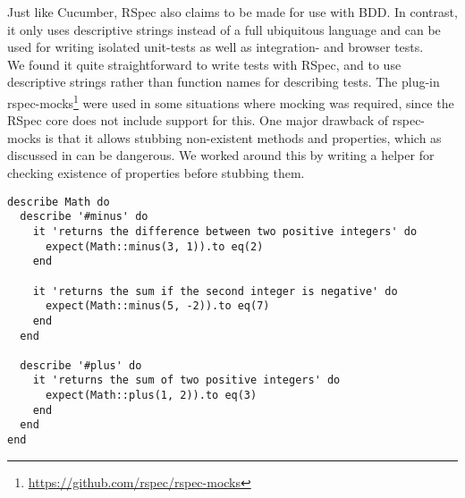 
Just like Cucumber, RSpec also claims to be made for use with
BDD\cite{web:rspec}. In contrast, it only uses descriptive strings
instead of a full ubiquitous language and can be used for writing
isolated unit-tests as well as integration- and browser tests.\\

We found it quite straightforward to write tests with RSpec, and to use
descriptive strings rather than function names for describing tests. The
plug-in rspec-mocks\footnote{\url{https://github.com/rspec/rspec-mocks}}
were used in some situations where mocking was required, since the RSpec
core does not include support for this. One major drawback of rspec-
mocks is that it allows stubbing non-existent methods and properties,
which as discussed in  can be dangerous. We
worked around this by writing a helper for checking existence of
properties before stubbing them.\\

\begin{lstlisting}[caption=Example of RSpec tests for a module.,
                   label=lst:rspec, float=t]
describe Math do
  describe '#minus' do
    it 'returns the difference between two positive integers' do
      expect(Math::minus(3, 1)).to eq(2)
    end

    it 'returns the sum if the second integer is negative' do
      expect(Math::minus(5, -2)).to eq(7)
    end
  end

  describe '#plus' do
    it 'returns the sum of two positive integers' do
      expect(Math::plus(1, 2)).to eq(3)
    end
  end
end
\end{lstlisting}
